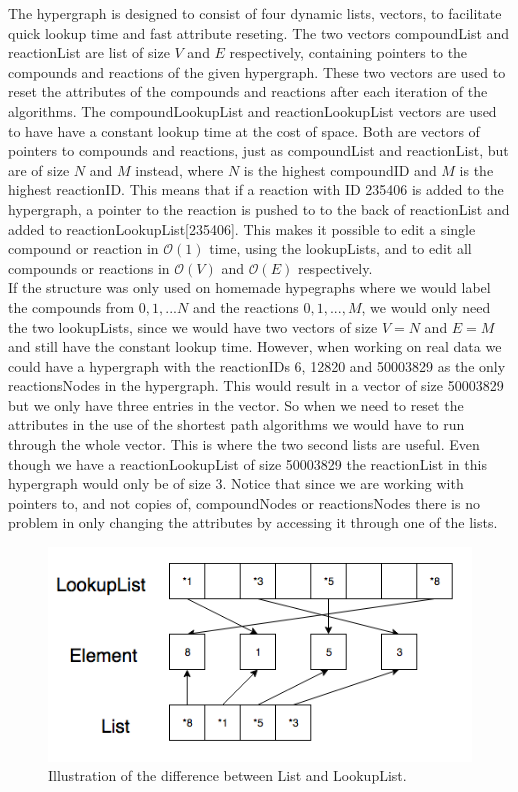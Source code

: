\documentclass[a4paper,10pt,titlepage]{paper}
\begin{document}
The hypergraph is designed to consist of four dynamic lists, vectors, to facilitate quick lookup time and fast attribute reseting. The two vectors compoundList and reactionList are list of size $V$ and $E$ respectively, containing pointers to the compounds and reactions of the given hypergraph. These two vectors are used to reset the attributes of the compounds and reactions after each iteration of the algorithms. The compoundLookupList and reactionLookupList vectors are used to have have a constant lookup time at the cost of space. Both are vectors of pointers to compounds and reactions, just as compoundList and reactionList, but are of size $N$ and $M$ instead, where $N$ is the highest compoundID and $M$ is the highest reactionID. This means that if a reaction with ID 235406 is added to the hypergraph, a pointer to the reaction is pushed to to the back of reactionList and added to reactionLookupList[235406]. This makes it possible to edit a single compound or reaction in $\mathcal{O}(1)$ time, using the lookupLists, and to edit all compounds or reactions in $\mathcal{O}(V)$ and $\mathcal{O}(E)$ respectively.\\
If the structure was only used on homemade hypegraphs where we would label the compounds from $0,1, ... N$ and the reactions $0,1,...,M$, we would only need the two lookupLists, since we would have two vectors of size $V=N$ and $E=M$ and still have the constant lookup time. However, when working on real data we could have a hypergraph with the reactionIDs 6, 12820 and 50003829 as the only reactionsNodes in the hypergraph. This would result in a vector of size 50003829 but we only have three entries in the vector. So when we need to reset the attributes in the use of the shortest path algorithms we would have to run through the whole vector. This is where the two second lists are useful. Even though we have a reactionLookupList of size 50003829 the reactionList in this hypergraph would only be of size 3.
Notice that since we are working with pointers to, and not copies of, compoundNodes or reactionsNodes there is no problem in only changing the attributes by accessing it through one of the lists. 
\begin{figure}[H]
\centering
\includegraphics[scale=0.5]{Billeder/ListOverview.png}
\caption{Illustration of the difference between List and LookupList.}
\label{fig::ListLookupList}
\end{figure}
\end{document}
